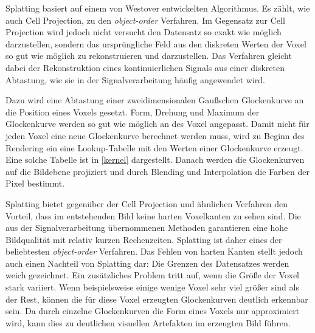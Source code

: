 \documentclass[a4paper,fontsize=12pt,toc=bib,parskip=half,ngerman]{scrartcl}
\begin{document}
Splatting basiert auf einem von Westover entwickelten Algorithmus\cite{westover1990footprint,westover1989interactive}. Es z\"ahlt, wie auch Cell Projection, zu den \textit{object-order} Verfahren. Im Gegensatz zur Cell Projection wird jedoch nicht versucht den Datensatz so exakt wie m\"oglich darzustellen, sondern das urspr\"ungliche Feld aus den diskreten Werten der Voxel so gut wie m\"oglich zu rekonstruieren und darzustellen. Das Verfahren gleicht dabei der Rekonstruktion eines kontinuierlichen Signals aus einer diskreten Abtastung, wie sie in der Signalverarbeitung h\"aufig angewendet wird.

Dazu wird eine Abtastung einer zweidimensionalen Gau{\ss}schen Glockenkurve an die Position eines Voxels gesetzt. Form, Drehung und Maximum der Glockenkurve werden so gut wie m\"oglich an des Voxel angepasst. Damit nicht f\"ur jeden Voxel eine neue Glockenkurve berechnet werden muss, wird zu Beginn des Rendering ein eine Lookup-Tabelle mit den Werten einer Glockenkurve erzeugt. Eine solche Tabelle ist in \cref{kernel} dargestellt. Danach werden die Glockenkurven auf die Bildebene projiziert und durch Blending und Interpolation die Farben der Pixel bestimmt.

Splatting bietet gegen\"uber der Cell Projection und \"ahnlichen Verfahren den Vorteil, dass im entstehenden Bild keine harten Voxelkanten zu sehen sind. Die aus der Signalverarbeitung \"ubernommenen Methoden garantieren eine hohe Bildqualit\"at mit relativ kurzen Rechenzeiten. Splatting ist daher eines der beliebtesten \textit{object-order} Verfahren.
Das Fehlen von harten Kanten stellt jedoch auch einen Nachteil von Splatting dar: Die Grenzen des Datensatzes werden weich gezeichnet. Ein zus\"atzliches Problem tritt auf, wenn die Gr\"o{\ss}e der Voxel stark variiert. Wenn beispielsweise einige wenige Voxel sehr viel gr\"o{\ss}er sind als der Rest, k\"onnen die f\"ur diese Voxel erzeugten Glockenkurven deutlich erkennbar sein. Da durch einzelne Glockenkurven die Form eines Voxels nur approximiert wird, kann dies zu deutlichen visuellen Artefakten im erzeugten Bild f\"uhren.
\end{document}
